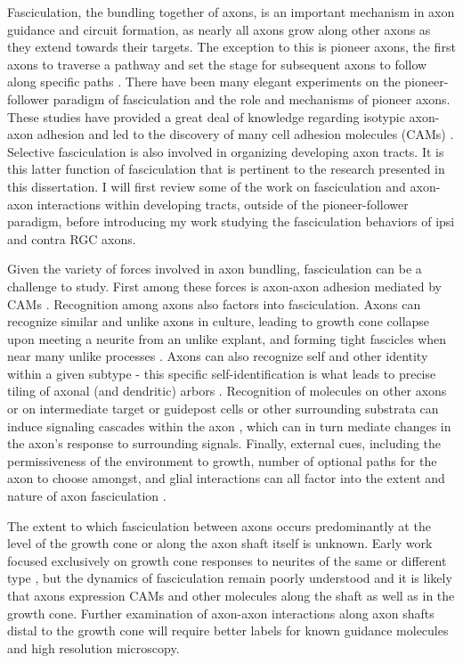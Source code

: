 Fasciculation, the bundling together of axons, is an important mechanism in axon guidance and circuit formation, as nearly all axons grow along other axons as they extend towards their targets.
The exception to this is pioneer axons, the first axons to traverse a pathway and set the stage for subsequent axons to follow along specific paths \cite{raper2010cellular,wang2013axons}.
There have been many elegant experiments on the pioneer-follower paradigm of fasciculation and the role and mechanisms of pioneer axons.
These studies have provided a great deal of knowledge regarding isotypic axon-axon adhesion and led to the discovery of many cell adhesion molecules (CAMs) \cite{raper2010cellular,wang2013axons}.
Selective fasciculation is also involved in organizing developing axon tracts.
It is this latter function of fasciculation that is pertinent to the research presented in this dissertation.
I will first review some of the work on fasciculation and axon-axon interactions within developing tracts, outside of the pioneer-follower paradigm, before introducing my work studying the fasciculation behaviors of ipsi and contra RGC axons.

Given the variety of forces involved in axon bundling, fasciculation can be a challenge to study.
First among these forces is axon-axon adhesion mediated by CAMs \cite{wang2013axons,van1998adhesion}.
Recognition among axons also factors into fasciculation.
Axons can recognize similar and unlike axons in culture, leading to growth cone collapse upon meeting a neurite from an unlike explant, and forming tight fascicles when near many unlike processes \cite{kapfhammer1986selective}.
Axons can also recognize self and other identity within a given subtype - this specific self-identification is what leads to precise tiling of axonal (and dendritic) arbors \cite{grueber2010self}.
Recognition of molecules on other axons or on intermediate target or guidepost cells or other surrounding substrata can induce signaling cascades within the axon \cite{bashaw2010signaling,wang2013axons}, which can in turn mediate changes in the axon's response to surrounding signals.
Finally, external cues, including the permissiveness of the environment to growth, number of optional paths for the axon to choose amongst, and glial interactions can all factor into the extent and nature of axon fasciculation \cite{wang2013axons}.

The extent to which fasciculation between axons occurs predominantly at the level of the growth cone or along the axon shaft itself is unknown.
Early work focused exclusively on growth cone responses to neurites of the same or different type \cite{nakajima1965selectivity}, but the dynamics of fasciculation remain poorly understood and it is likely that axons expression CAMs and other molecules along the shaft as well as in the growth cone. 
Further examination of axon-axon interactions along axon shafts distal to the growth cone will require better labels for known guidance molecules and high resolution microscopy.